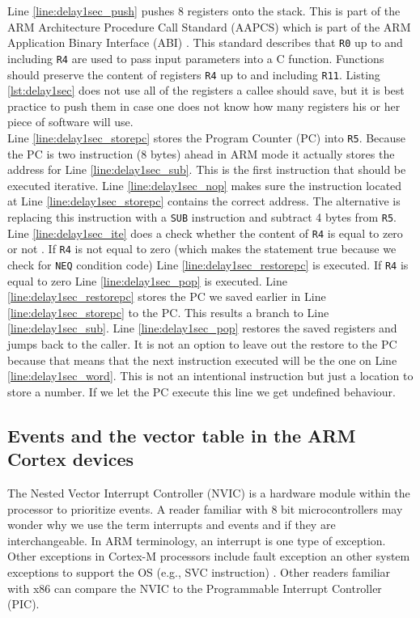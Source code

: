 Line \ref{line:delay1sec_push} pushes 8 registers onto the stack. 
This is part of the ARM Architecture Procedure Call Standard (AAPCS) which is part of the ARM Application Binary Interface (ABI) \cite{IntroEmbeddedSystems}.
This standard describes that \texttt{R0} up to and including \texttt{R4} are used to pass input parameters into a C function. 
Functions should preserve the content of registers \texttt{R4} up to and including \texttt{R11}.
Listing \ref{lst:delay1sec} does not use all of the registers a callee should save, but it is best practice to push them in case one does not know how many registers his or her piece of software will use.\\
Line \ref{line:delay1sec_storepc} stores the Program Counter (PC) into \texttt{R5}. 
Because the PC is two instruction (8 bytes) ahead in ARM mode it actually stores the address for Line \ref{line:delay1sec_sub}.
This is the first instruction that should be executed iterative.
Line \ref{line:delay1sec_nop} makes sure the instruction located at Line \ref{line:delay1sec_storepc} contains the correct address. The alternative is replacing this instruction with a \texttt{SUB} instruction and subtract 4 bytes from \texttt{R5}.
Line \ref{line:delay1sec_ite} does a check whether the content of \texttt{R4} is equal to zero or not \cite{DefinitiveGuide}.
If \texttt{R4} is not equal to zero (which makes the statement true because we check for \texttt{NEQ} condition code) Line \ref{line:delay1sec_restorepc} is executed. If \texttt{R4} is equal to zero Line \ref{line:delay1sec_pop} is executed.
Line \ref{line:delay1sec_restorepc} stores the PC we saved earlier in Line \ref{line:delay1sec_storepc} to the PC.
This results a branch to Line \ref{line:delay1sec_sub}.
Line \ref{line:delay1sec_pop} restores the saved registers and jumps back to the caller. 
It is not an option to leave out the restore to the PC because that means that the next instruction executed will be the one on Line \ref{line:delay1sec_word}.
This is not an intentional instruction but just a location to store a number. If we let the PC execute this line we get undefined behaviour.

\newpage
\subsection{Events and the vector table in the ARM Cortex devices}
\label{subsec:appendix_vector}

The Nested Vector Interrupt Controller (NVIC) is a hardware module within the processor to prioritize events.
A reader familiar with 8 bit microcontrollers may wonder why we use the term interrupts and events and if they are interchangeable.
In ARM terminology, an interrupt is one type of exception. 
Other exceptions in Cortex-M processors include fault exception an other system exceptions to support the OS (e.g., SVC instruction) \cite{DefinitiveGuide}.
Other readers  familiar with x86 can compare the NVIC to the Programmable Interrupt Controller (PIC). \newline

